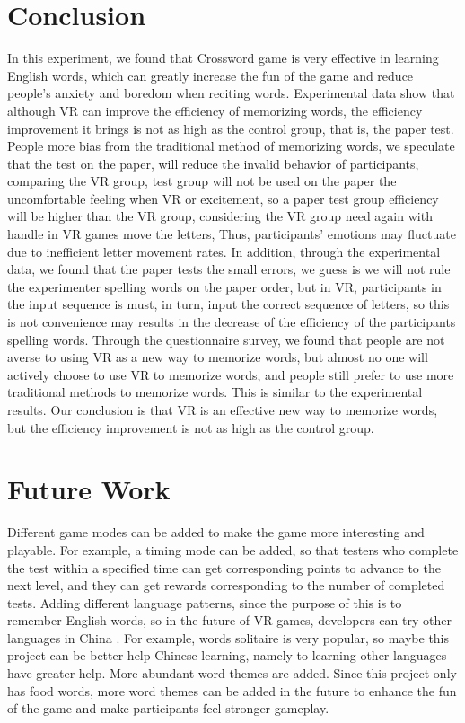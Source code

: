 \documentclass{vgtc}                          %
\begin{document}
\section{Conclusion}
In this experiment, we found that Crossword game is very effective in learning English words, which can greatly increase the fun of the game and reduce people's anxiety and boredom when reciting words. Experimental data show that although VR can improve the efficiency of memorizing words, the efficiency improvement it brings is not as high as the control group, that is, the paper test. People more bias from the traditional method of memorizing words, we speculate that the test on the paper, will reduce the invalid behavior of participants, comparing the VR group, test group will not be used on the paper the uncomfortable feeling when VR or excitement, so a paper test group efficiency will be higher than the VR group, considering the VR group need again with handle in VR games move the letters, Thus, participants' emotions may fluctuate due to inefficient letter movement rates. In addition, through the experimental data, we found that the paper tests the small errors, we guess is we will not rule the experimenter spelling words on the paper order, but in VR, participants in the input sequence is must, in turn, input the correct sequence of letters, so this is not convenience may results in the decrease of the efficiency of the participants spelling words. Through the questionnaire survey, we found that people are not averse to using VR as a new way to memorize words, but almost no one will actively choose to use VR to memorize words, and people still prefer to use more traditional methods to memorize words. This is similar to the experimental results. Our conclusion is that VR is an effective new way to memorize words, but the efficiency improvement is not as high as the control group.

\section{Future Work}
Different game modes can be added to make the game more interesting and playable. For example, a timing mode can be added, so that testers who complete the test within a specified time can get corresponding points to advance to the next level, and they can get rewards corresponding to the number of completed tests.
Adding different language patterns, since the purpose of this is to remember English words, so in the future of VR games, developers can try other languages in China \cite{jiang2020english}. For example, words solitaire is very popular, so maybe this project can be better help Chinese learning, namely to learning other languages have greater help\cite{chun2003computer}.
More abundant word themes are added. Since this project only has food words, more word themes can be added in the future to enhance the fun of the game and make participants feel stronger gameplay.
\end{document}
